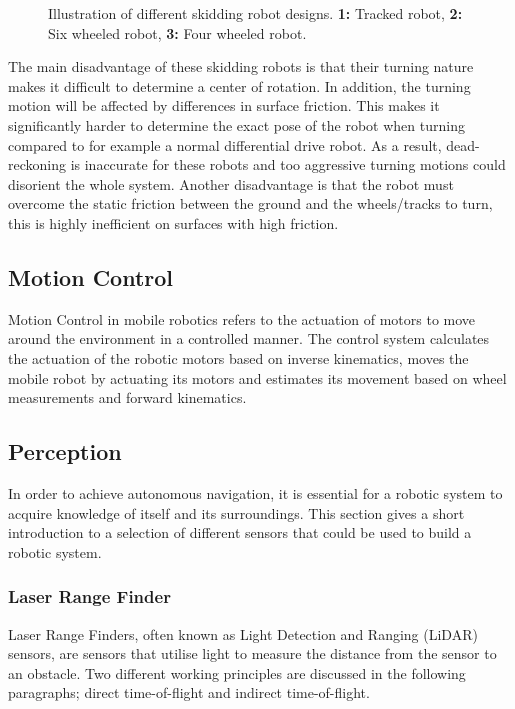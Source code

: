 \begin{figure}[htp]
  \centering
  
  \caption{Illustration of different skidding robot designs. \textbf{1:} Tracked robot, \textbf{2:} Six wheeled robot, \textbf{3:} Four wheeled robot.}
  \label{fig:skidDrive}
\end{figure}
The main disadvantage of these skidding robots is that their turning nature makes it difficult to determine a center of rotation. In addition, the turning motion will be affected by differences in surface friction. This makes it significantly harder to determine the exact pose of the robot when turning compared to for example a normal differential drive robot. As a result, dead-reckoning is inaccurate for these robots and too aggressive turning motions could disorient the whole system. Another disadvantage is that the robot must overcome the static friction between the ground and the wheels/tracks to turn, this is highly inefficient on surfaces with high friction.

\subsection{Motion Control}\label{sec:T:AN:MotionControl}
Motion Control in mobile robotics refers to the actuation of motors to move  around the environment in a controlled manner. The control system calculates the actuation of the robotic motors based on inverse kinematics, moves the mobile robot by actuating its motors and estimates its movement based on wheel measurements and forward kinematics.


\subsection{Perception}\label{sec:T:AN:Perception}
In order to achieve autonomous navigation, it is essential for a robotic system to acquire knowledge of itself and its surroundings. This section gives a short introduction to a selection of different sensors that could be used to build a robotic system.

\subsubsection{Laser Range Finder}
Laser Range Finders, often known as Light Detection and Ranging (LiDAR) sensors, are sensors that utilise light to measure the distance from the sensor to an obstacle. Two different working principles are discussed in the following paragraphs; direct time-of-flight and indirect time-of-flight.

